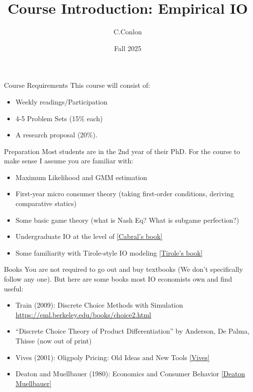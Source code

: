 


\title [Course Intro]{Course Introduction: Empirical IO}
\author{C.Conlon}
\date{Fall 2025}


\begin{frame}
\titlepage
\end{frame}

\begin{frame}{Course Requirements}
This course will consist of:
\begin{itemize}
    \item Weekly readings/Participation
    \item 4-5 Problem Sets (15\% each)
    \item A research proposal (20\%).
\end{itemize}
\end{frame}


\begin{frame}{Preparation}
Most students are in the 2nd year of their PhD. For the course to make sense I assume you are familiar with:
\begin{itemize}
    \item Maximum Likelihood and GMM estimation
    \item First-year micro consumer theory (taking first-order conditions, deriving comparative statics)
    \item Some basic game theory (what is Nash Eq? What is subgame perfection?)
    \item Undergraduate IO at the level of \href{https://www.amazon.com/Introduction-Industrial-Organization-MIT-Press/dp/0262035944}{[Cabral's book]}
    \item Some familiarity with Tirole-style IO modeling \href{https://www.amazon.com/Theory-Industrial-Organization-MIT-Press/dp/0262200716/}{[Tirole's book]}
\end{itemize}
\end{frame}



\begin{frame}{Books}
You are not required to go out and buy textbooks (We don't specifically follow any one). But here are some books most IO economists own and find useful:
\begin{itemize}
    \item Train (2009): Discrete Choice Methods with Simulation \url{https://eml.berkeley.edu/books/choice2.html}
    \item ``Discrete Choice Theory of Product Differentiation'' by Anderson, De Palma, Thisse (now out of print)
    \item Vives (2001): Oligpoly Pricing: Old Ideas and New Tools \href{https://www.amazon.com/Oligopoly-Pricing-Old-Ideas-Tools/dp/026272040X}{[Vives]}
    \item Deaton and Muellbauer (1980): Economics and Consumer Behavior \href{https://www.amazon.com/Economics-Consumer-Behavior-Angus-Deaton/dp/0521296765}{[Deaton Muellbauer]}
\end{itemize}
\end{frame}

